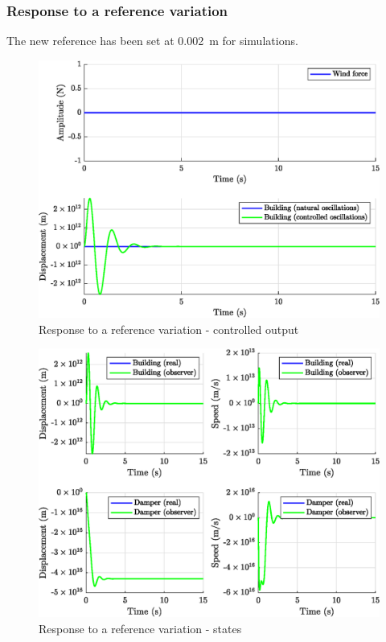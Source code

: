 \subsubsection{Response to a reference variation}
The new reference has been set at \SI{0.002}{\meter} for simulations.
\begin{figure}[H]
    \centering
    \includegraphics[width=\textwidth]{resources/eps/reference-controller.eps}
    \caption{Response to a reference variation - controlled output}
\end{figure}
\begin{figure}[H]
    \centering
    \includegraphics[width=\textwidth]{resources/eps/reference-observer.eps}
    \caption{Response to a reference variation - states}
\end{figure}

